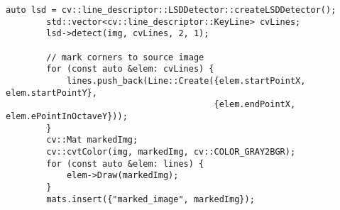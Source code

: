\documentclass[12pt, onecolumn]{article}
\newcommand\normf{\fangsong}
\begin{document}
	\begin{lstlisting}[caption={\normf LSD直线提取代码}]
	    auto lsd = cv::line_descriptor::LSDDetector::createLSDDetector();
	    std::vector<cv::line_descriptor::KeyLine> cvLines;
	    lsd->detect(img, cvLines, 2, 1);
	
	    // mark corners to source image
	    for (const auto &elem: cvLines) {
	        lines.push_back(Line::Create({elem.startPointX, elem.startPointY},
	                                     {elem.endPointX, elem.ePointInOctaveY}));
	    }
	    cv::Mat markedImg;
	    cv::cvtColor(img, markedImg, cv::COLOR_GRAY2BGR);
	    for (const auto &elem: lines) {
	        elem->Draw(markedImg);
	    }
	    mats.insert({"marked_image", markedImg});
	\end{lstlisting}
\end{document}
